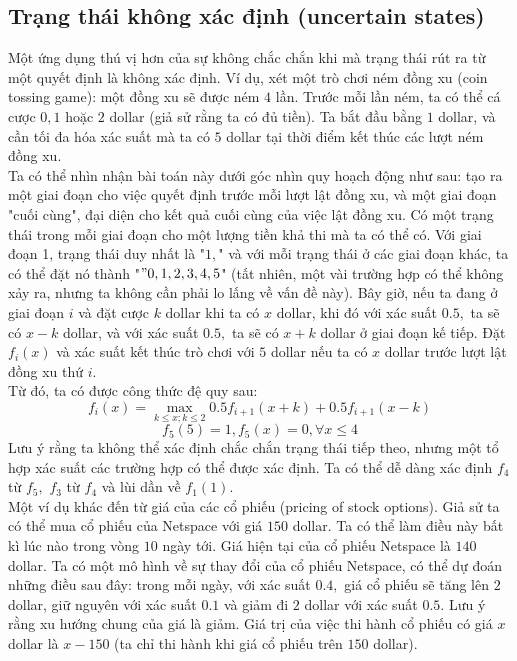 \documentclass[12pt,a4paper]{article}
\begin{document}
\subsection{Trạng thái không xác định (uncertain states)}
Một ứng dụng thú vị hơn của sự không chắc chắn khi mà trạng thái rút ra từ một quyết định là không xác định. Ví dụ, xét một trò chơi ném đồng xu (coin tossing game): một đồng xu sẽ được ném \(4\) lần. Trước mỗi lần ném, ta có thể cá cược \(0, 1\) hoặc \(2\) dollar (giả sử rằng ta có đủ tiền). Ta bắt đầu bằng \(1\) dollar, và cần tối đa hóa xác suất mà ta có \(5\) dollar tại thời điểm kết thúc các lượt ném đồng xu. \\
Ta có thể nhìn nhận bài toán này dưới góc nhìn quy hoạch động như sau: tạo ra một giai đoạn cho việc quyết định trước mỗi lượt lật đồng xu, và một giai đoạn "cuối cùng", đại diện cho kết quả cuối cùng của việc lật đồng xu. Có một trạng thái trong mỗi giai đoạn cho một lượng tiền khả thi mà ta có thể có. Với giai đoạn 1, trạng thái duy nhất là "\(1,\)" và với mỗi trạng thái ở các giai đoạn khác, ta có thể đặt nó thành "\("0, 1, 2, 3, 4, 5\)" (tất nhiên, một vài trường hợp có thể không xảy ra, nhưng ta không cần phải lo lấng về vấn đề này). Bây giờ, nếu ta đang ở giai đoạn \(i\) và đặt cược \(k\) dollar khi ta có \(x\) dollar, khi đó với xác suất \(0.5,\) ta sẽ có \(x - k\) dollar, và với xác suất \(0.5,\) ta sẽ có \(x + k\) dollar ở giai đoạn kế tiếp. Đặt \({f_i}\left( x \right)\) và xác suất kết thúc trò chơi với \(5\) dollar nếu ta có \(x\) dollar trước lượt lật đồng xu thứ \(i.\) \\
Từ đó, ta có được công thức đệ quy sau:
\[{f_i}\left( x \right) = \mathop {\max }\limits_{k \leqslant x;k \leqslant 2} 0.5{f_{i + 1}}\left( {x + k} \right) + 0.5{f_{i + 1}}\left( {x - k} \right)\]
\[{f_5}\left( 5 \right) = 1,{f_5}\left( x \right) = 0,\forall x \leqslant 4\]
Lưu ý rằng ta không thể xác định chắc chắn trạng thái tiếp theo, nhưng một tổ hợp xác suất các trường hợp có thể được xác định. Ta có thể dễ dàng xác định \(f_4\) từ \(f_5,\) \(f_3\) từ \(f_4\) và lùi dần về \(f_1 \left( 1 \right).\)\\
Một ví dụ khác đến từ giá của các cổ phiếu (pricing of stock options). Giả sử ta có thể mua cổ phiếu của Netspace với giá \(150\) dollar. Ta có thể làm điều này bất kì lúc nào trong vòng \(10\) ngày tới. Giá hiện tại của cổ phiếu Netspace là \(140\) dollar. Ta có một mô hình về sự thay đổi của cổ phiếu Netspace, có thể dự đoán những điều sau đây: trong mỗi ngày, với xác suất \(0.4,\) giá cổ phiếu sẽ tăng lên \(2\) dollar, giữ nguyên với xác suất \(0.1\) và giảm đi \(2\) dollar với xác suất \(0.5.\) Lưu ý rằng xu hướng chung của giá là giảm. Giá trị của việc thi hành cổ phiếu có giá \(x\) dollar là \(x - 150\) (ta chỉ thi hành khi giá cổ phiếu trên \(150\) dollar).\\
\end{document}
